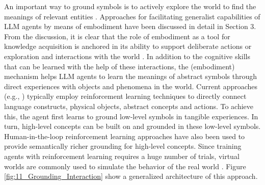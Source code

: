 \documentclass[10pt,journal,compsoc]{IEEEtran}
\begin{document}
	An important way to ground symbols is to actively explore the world to find the meanings of relevant entities \cite{macdorman1999grounding,jacobsson2007rule,kulick2013active}. Approaches for facilitating generalist capabilities of LLM agents by means of embodiment have been discussed in detail in Section 3. From the discussion, it is clear that the role of embodiment as a tool for knowledge acquisition is anchored in its ability to support deliberate actions or exploration and interactions with the world \cite{colle2024improving,roy2005semiotic,mecattaf2024little}. In addition to the cognitive skills that can be learned with the help of these interactions, the (embodiment) mechanism helps LLM agents to learn the meanings of abstract symbols through direct experiences with objects and phenomena in the world. Current approaches (e.g., \cite{hsu2024grounding,carta2023grounding,zadem2024llm,gehring2024rlef,tan2024true}) typically employ reinforcement learning techniques to directly connect language constructs, physical objects, abstract concepts and actions. To achieve this, the agent first learns to ground low-level symbols in tangible experiences. In turn, high-level concepts can be built on and grounded in these low-level symbols. Human-in-the-loop reinforcement learning approaches \cite{lilanguage,moroncelli2024integrating} have also been used to provide semantically richer grounding for high-level concepts. Since training agents with reinforcement learning requires a huge number of trials, virtual worlds are commonly used to simulate the behavior of the real world \cite{cao2024survey,hong20233d,guan2023leveraging,cheng2024llm+}. Figure \ref{fig:11_Grounding_Interaction} show a generalized architecture of this approach.
	
	
	
\end{document}
